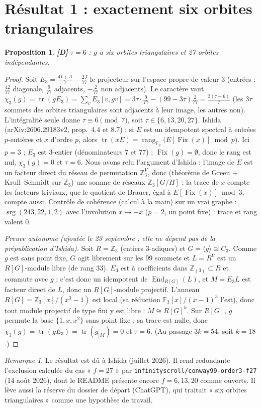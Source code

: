 \documentclass[11pt,a4paper]{article}
\newtheorem{proposition}[theorem]{Proposition}
\theoremstyle{remark}
\newtheorem{remark}[theorem]{Remarque}
\newcommand{\F}{\mathbb{F}}
\newcommand{\Z}{\mathbb{Z}}
\newcommand{\Fix}{\operatorname{Fix}}
\newcommand{\srg}{\operatorname{srg}}
\newcommand{\tr}{\operatorname{tr}}
\newcommand{\rg}{\operatorname{rang}}
\newcommand{\st}[1]{\textbf{[#1]}}
\newcommand{\code}[1]{\texttt{#1}}
\begin{document}
\section{Résultat 1 : exactement six orbites triangulaires}\label{sec:tau}
\begin{proposition} \st{D}
$\tau=6$ : $g$ a six orbites triangulaires et 27 orbites indépendantes.
\end{proposition}
\begin{proof}
Soit $E_3=\frac{4I+A}{7}-\frac{2J}{77}$ le projecteur sur l'espace propre de valeur 3 (entrées : $\tfrac{42}{77}$ diagonale, $\tfrac{9}{77}$ adjacents, $-\tfrac{2}{77}$
non adjacents). Le caractère vaut
$\chi_3(g)=\tr(gE_3)=\sum_v E_3[v,gv]=3\tau\cdot\tfrac{9}{77}-(99-3\tau)\tfrac{2}{77}=\tfrac{3(\tau-6)}{7}$ (les $3\tau$ sommets des orbites triangulaires sont
adjacents à leur image, les autres non). L'intégralité seule donne $\tau\equiv6\pmod 7$, soit $\tau\in\{6,13,20,27\}$.
Ishida (arXiv:2606.29183v2, prop.~4.4 et 8.7) : si $E$ est un idempotent spectral à entrées $p$-entières et $x$ d'ordre $p$, alors
$\tr(xE)=\rg_{\F_p}\bigl(E[\Fix(x)]\bmod p\bigr)$. Ici $p=3$ ; $E_3$ est $3$-entier (dénominateurs $7$ et $77$) ; $\Fix(g)=\emptyset$, donc le rang est nul,
$\chi_3(g)=0$ et $\tau=6$.
Nous avons relu l'argument d'Ishida : l'image de $E$ est un facteur direct du réseau de permutation $\Z_3^{V}$, donc (théorème de Green + Krull--Schmidt sur
$\Z_3$) une somme de réseaux $\Z_3[G/H]$ ; la trace de $x$ compte les facteurs triviaux, que le quotient de Brauer, égal à $E[\Fix(x)]\bmod 3$, compte aussi.
Contrôle de cohérence (calcul à la main) sur un vrai graphe : $\srg(243,22,1,2)$ avec l'involution $x\mapsto-x$ ($p=2$, un point fixe) : trace et rang valent $0$.

\emph{Preuve autonome (ajoutée le 23 septembre ; elle ne dépend pas de la prépublication d'Ishida).} Soit $R=\Z_3$ (entiers $3$-adiques) et
$G=\langle g\rangle\cong C_3$. Comme $g$ est sans point fixe, $G$ agit librement sur les 99 sommets et $L=R^V$ est un $R[G]$-module libre (de rang 33).
$E_3$ est à coefficients dans $\Z_{(3)}\subset R$ et commute avec $g$ ; c'est donc un idempotent de $\operatorname{End}_{R[G]}(L)$, et $M=E_3L$ est facteur direct
de $L$, donc un $R[G]$-module projectif. L'anneau $R[G]=\Z_3[x]/(x^3-1)$ est local (sa réduction $\F_3[x]/(x-1)^3$ l'est), donc tout module projectif
de type fini y est libre : $M\cong R[G]^k$. Sur $R[G]$, $g$ permute la base $\{1,x,x^2\}$ sans point fixe ; sa trace est nulle, donc
$\chi_3(g)=\tr(gE_3)=\tr(g_{|M})=0$ et $\tau=6$. (Au passage $3k=54$, soit $k=18$.)
\end{proof}
\begin{remark}
Le résultat est dû à Ishida (juillet 2026). Il rend redondante l'exclusion calculée du cas « $f=27$ » par \code{infinityscroll/conway99-order3-f27}
(14 août 2026), dont le README présente encore $f=6,13,20$ comme ouverts. Il lève aussi la réserve du dossier de départ (ChatGPT), qui traitait
« six orbites triangulaires » comme une hypothèse de travail.
\end{remark}
\end{document}
